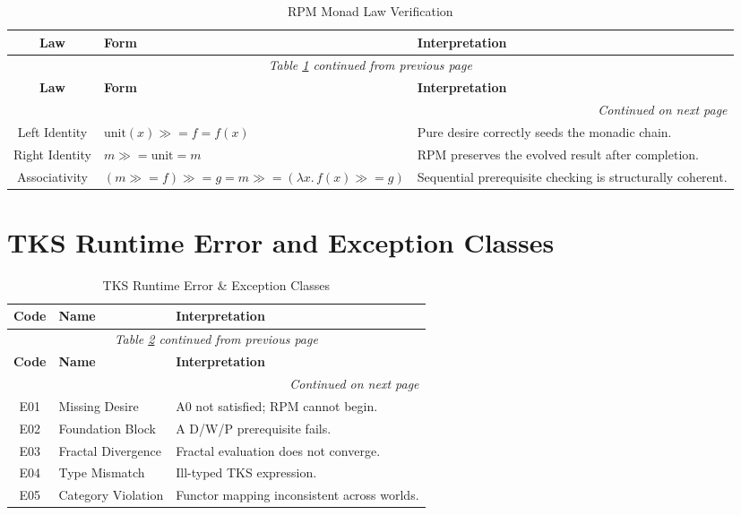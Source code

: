 \renewcommand{\arraystretch}{1.25}
\small
\begin{longtable}{c|p{4cm}|p{6.5cm}}
\caption{RPM Monad Law Verification}
\label{tab:rpm-monad-laws} \\
\toprule
\textbf{Law}
& \textbf{Form}
& \textbf{Interpretation}
\\
\midrule
\endfirsthead
\multicolumn{3}{c}{\textit{Table \ref{tab:rpm-monad-laws} continued from previous page}} \\
\toprule
\textbf{Law}
& \textbf{Form}
& \textbf{Interpretation}
\\
\midrule
\endhead
\midrule
\multicolumn{3}{r}{\textit{Continued on next page}} \\
\endfoot
\bottomrule
\endlastfoot

Left Identity & $\text{unit}(x) \gg= f = f(x)$ &
Pure desire correctly seeds the monadic chain. \\

Right Identity & $m \gg= \text{unit} = m$ &
RPM preserves the evolved result after completion. \\

Associativity & $(m \gg= f) \gg= g = m \gg= (\lambda x.\, f(x) \gg= g)$ &
Sequential prerequisite checking is structurally coherent. \\

\end{longtable}
\normalsize

\section{TKS Runtime Error and Exception Classes}

\renewcommand{\arraystretch}{1.25}
\small
\begin{longtable}{c|p{2.5cm}|p{7cm}}
\caption{TKS Runtime Error \& Exception Classes}
\label{tab:tks-errors} \\
\toprule
\textbf{Code}
& \textbf{Name}
& \textbf{Interpretation}
\\
\midrule
\endfirsthead
\multicolumn{3}{c}{\textit{Table \ref{tab:tks-errors} continued from previous page}} \\
\toprule
\textbf{Code}
& \textbf{Name}
& \textbf{Interpretation}
\\
\midrule
\endhead
\midrule
\multicolumn{3}{r}{\textit{Continued on next page}} \\
\endfoot
\bottomrule
\endlastfoot

E01 & Missing Desire & A0 not satisfied; RPM cannot begin. \\

E02 & Foundation Block & A D/W/P prerequisite fails. \\

E03 & Fractal Divergence & Fractal evaluation does not converge. \\

E04 & Type Mismatch & Ill-typed TKS expression. \\

E05 & Category Violation & Functor mapping inconsistent across worlds. \\

\end{longtable}
\normalsize

